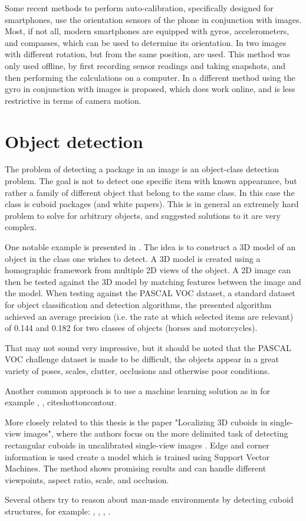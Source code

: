 Some recent methods to perform auto-calibration, specifically designed for smartphones, use the orientation sensors of the phone in conjunction with images.
Most, if not all, modern  smartphones are equipped with gyros, accelerometers, and compasses, which can be used to determine its orientation.
In \cite{saponaro2013towards} two images with different rotation, but from the same position, are used.
This method was only used offline, by first recording sensor readings and taking snapshots, and then performing the calculations on a computer.
In \cite{jia2014online} a different method using the gyro in conjunction with images is proposed, which does work online, and is less restrictive in terms of camera motion.

\section{Object detection} \label{related_work:object_detection}
The problem of detecting a package in an image is an object-class detection problem.
The goal is not to detect one specific item with known appearance, but rather a family of different object that belong to the same class.
In this case the class is cuboid packages (and white papers).
This is in general an extremely hard problem to solve for arbitrary objects, and suggested solutions to it are very complex.

One notable example is presented in \cite{yan20073d}. The idea is to construct a 3D model of an object in the class one wishes to detect.
A 3D model is created using a homographic framework from  multiple 2D views of the object.
A 2D image can then be tested against the 3D model by matching features between the image and the model. 
When testing against the PASCAL VOC dataset, a standard dataset for object classification and detection algorithms, the presented algorithm achieved an average precision (i.e. the rate at which selected items are relevant) of 0.144 and 0.182 for two classes of objects (horses and motorcycles). 

That may not sound very impressive, but it should be noted that the PASCAL VOC challenge dataset is made to be difficult, the objects appear in a great variety of poses, scales, clutter, occlusions and otherwise poor conditions.\cite{everingham2010pascal}

Another common approach is to use a machine learning solution as in for example \cite{viola2001rapid}, \cite{fergus2003object}, cite{shottoncontour}.

More closely related to this thesis is the paper "Localizing 3D cuboids in single-view images", where the authors focus on the more delimited task of detecting rectangular cuboids in uncalibrated single-view images \cite{xiaolocalizing}.
Edge and corner information is used create a model which is trained using Support Vector Machines.
The method shows promising results and can handle different viewpoints, aspect ratio, scale, and occlusion.

Several others try to reason about man-made environments by detecting cuboid structures, for example: \cite{hedau2010thinking}, \cite{hedau2012recovering}, \cite{gupta2010estimating}, \cite{del2012bayesian}.
